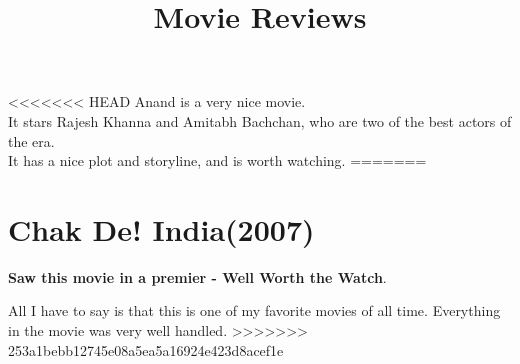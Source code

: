 \documentclass[11pt]{article}
\title{\textbf{Movie Reviews}}
\author{}
\date{}
\begin{document}
\maketitle
<<<<<<< HEAD
Anand is a very nice movie.\\
It stars Rajesh Khanna and Amitabh Bachchan, who are two of the best actors of the era.\\
It has a nice plot and storyline, and is worth watching.
=======
\section*{Chak De! India(2007)}
\textbf{Saw this movie in a premier - Well Worth the Watch}.

All I have to say is that this is one of my favorite movies of all time. Everything in the movie was very well handled.
>>>>>>> 253a1bebb12745e08a5ea5a16924e423d8acef1e
\end{document}
